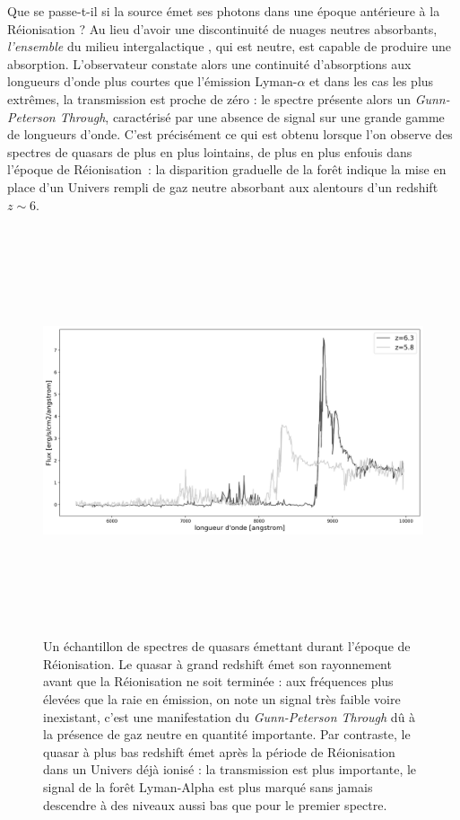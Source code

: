Que se passe-t-il si la source émet ses photons dans une époque antérieure à la Réionisation ? Au lieu d'avoir une discontinuité de nuages neutres absorbants, \textit{l'ensemble} du milieu intergalactique , qui est neutre, est capable de produire une absorption. L'observateur constate alors une continuité d'absorptions aux longueurs d'onde plus courtes que l'émission Lyman-$\alpha$ et dans les cas les plus extrêmes, la transmission est proche de zéro : le spectre présente alors un \textit{Gunn-Peterson Through}, caractérisé par une absence de signal sur une grande gamme de longueurs d'onde. C'est précisément ce qui est obtenu lorsque l'on observe des spectres de quasars de plus en plus lointains, de plus en plus enfouis dans l'époque de Réionisation~: la disparition graduelle de la forêt indique la mise en place d'un Univers rempli de gaz neutre absorbant aux alentours d'un redshift $z\sim 6$.
\begin{figure}[htbp]
	\centering
		\includegraphics[height=12cm]{figs/Becker01.png}
		\caption[Spectres de quasars durant la Réionisation]{Un échantillon de spectres de quasars émettant durant l'époque de Réionisation. Le quasar à grand redshift émet son rayonnement avant que la Réionisation ne soit terminée : aux fréquences plus élevées que la raie en émission, on note un signal très faible voire inexistant, c'est une manifestation du \textit{Gunn-Peterson Through} dû à la présence de gaz neutre en quantité importante. Par contraste, le quasar à plus bas redshift émet après la période de Réionisation dans un Univers déjà ionisé : la transmission est plus importante, le signal de la forêt Lyman-Alpha est plus marqué sans jamais descendre à des niveaux aussi bas que pour le premier spectre.}
	\label{f:fan06}
\end{figure}

